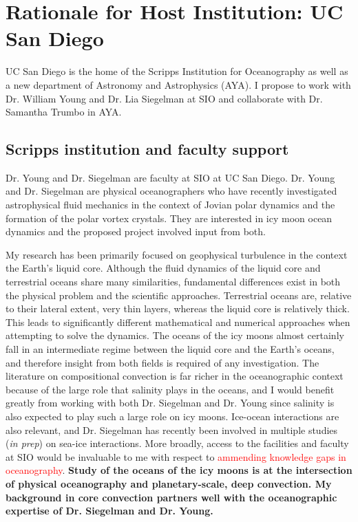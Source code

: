 \documentclass{article}
\title{}
\author{}
\date{}
\begin{document}
\section*{Rationale for Host Institution: UC San Diego}
UC San Diego is the home of the Scripps Institution for Oceanography as well as a new department of Astronomy and Astrophysics (AYA). I propose to work with Dr. William Young and Dr. Lia Siegelman at SIO and collaborate with Dr. Samantha Trumbo in AYA.
\subsection*{Scripps institution and faculty support}
Dr. Young and Dr. Siegelman are faculty at SIO at UC San Diego. Dr. Young and Dr. Siegelman are physical oceanographers who have recently investigated astrophysical fluid mechanics in the context of Jovian polar dynamics and the formation of the polar vortex crystals\cite{lS22,lS22b,lS24}. They are interested in icy moon ocean dynamics and the proposed project involved input from both.

My research has been primarily focused on geophysical turbulence in the context the Earth's liquid core. Although the fluid dynamics of the liquid core and terrestrial oceans share many similarities, fundamental differences exist in both the physical problem and the scientific approaches. Terrestrial oceans are, relative to their lateral extent, very thin layers, whereas the liquid core is relatively thick. This leads to significantly different mathematical and numerical approaches when attempting to solve the dynamics.
The oceans of the icy moons almost certainly fall in an intermediate regime between the liquid core and the Earth's oceans, and therefore insight from both fields is required of any investigation. The literature on compositional convection is far richer in the oceanographic context because of the large role that salinity plays in the oceans, and I would benefit greatly from working with both Dr. Siegelman and Dr. Young since salinity is also expected to play such a large role on icy moons. 
Ice-ocean interactions are also relevant, and Dr. Siegelman has recently been involved in multiple studies (\textit{in prep}) on sea-ice interactions. More broadly, access to the facilities and faculty at SIO would be invaluable to me with respect to \textcolor{red}{ammending knowledge gaps in oceanography}. \textbf{Study of the oceans of the icy moons is at the intersection of physical oceanography and planetary-scale, deep convection. My background in core convection partners well with the oceanographic expertise of Dr. Siegelman and Dr. Young.}
\end{document}
